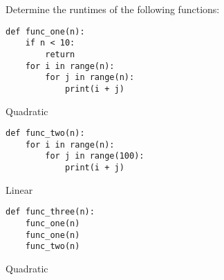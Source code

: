 \begin{blocksection}
\question
Determine the runtimes of the following functions:


\begin{blocksection}
\begin{lstlisting}
def func_one(n):
    if n < 10:
        return
    for i in range(n):
        for j in range(n):
            print(i + j)
\end{lstlisting}
\end{blocksection}

\begin{solution} [0.5in]
    Quadratic
\end{solution}

\begin{blocksection}
\begin{lstlisting}
def func_two(n):
    for i in range(n):
        for j in range(100):
            print(i + j)
\end{lstlisting}
\end{blocksection}


\begin{solution} [0.5in]
    Linear
\end{solution}

\begin{blocksection}
\begin{lstlisting}
def func_three(n):
    func_one(n)
    func_one(n)
    func_two(n)
\end{lstlisting}
\end{blocksection}


\begin{solution} [0.5in]
    Quadratic
\end{solution}

\end{blocksection}